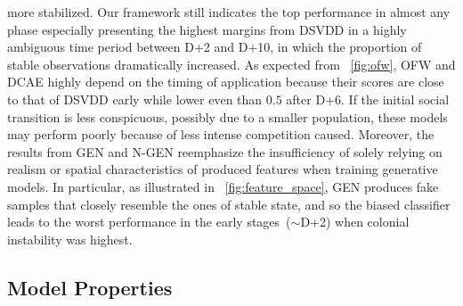 \documentclass[letterpaper]{article} %
\let\orgautoref\autoref
\renewcommand{\autoref}
{\def\equationautorefname{Equation}%
\def\figureautorefname{Fig.}%
\def\subfigureautorefname{Fig.}%
\def\Itemautorefname{item}%
\def\tableautorefname{Table}%
\def\exerciseautorefname{Exercise}%
\def\starexerciseautorefname{Exercise}%
\def\sectionautorefname{Section}%
\def\subsectionautorefname{Section}%
\def\subsubsectionautorefname{Section}%
\def\chapterautorefname{Section}%
\def\partautorefname{Part}%
\orgautoref}
\begin{document}
more stabilized. Our framework still indicates the top performance in
almost any phase especially presenting the highest margins from DSVDD
in a highly ambiguous time period between D+2 and D+10, in which the
proportion of stable observations dramatically increased.
As expected from~\autoref{fig:ofw}, OFW and DCAE highly depend on the
timing of application because their scores are close to that of DSVDD
early while lower even than $0.5$ after D+6.
If the initial social transition is less conspicuous, possibly due to
a smaller population, these models may perform poorly because of less
intense competition caused.
Moreover, the results from GEN and \mbox{N-GEN}
reemphasize the insufficiency of solely relying on realism or
spatial characteristics of produced features when training generative
models.
In particular, as illustrated in~\autoref{fig:feature_space},
GEN produces fake samples that closely resemble the ones of stable state,
and so the biased classifier leads to the worst performance in
the early stages~($\sim$D+2) when colonial instability was highest.

\vspace{-3.23mm}
\subsection{Model Properties}
\label{sec:model_properties}
\end{document}
